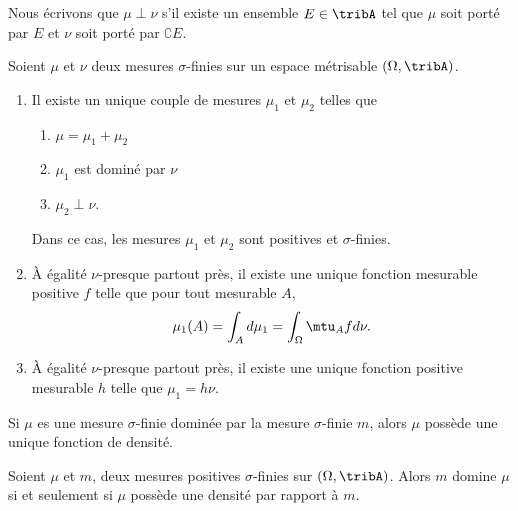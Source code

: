 Nous écrivons que \( \mu\perp\nu\) s'il existe un ensemble \( E\in\tribA\) tel que \( \mu\) soit porté par \( E\) et \( \nu\) soit porté par \( \complement E\).

\begin{theorem}
    Soient \( \mu\) et \( \nu\) deux mesures \( \sigma\)-finies sur un espace métrisable \( (\Omega,\tribA)\).
    \begin{enumerate}
        \item
            Il existe un unique couple de mesures \( \mu_1\) et \( \mu_2\) telles que
            \begin{enumerate}
                \item
                    \( \mu=\mu_1+\mu_2\)
                \item
                    \( \mu_1\) est dominé par \( \nu\)
                \item
                    \( \mu_2\perp \nu\).
            \end{enumerate}
            Dans ce cas, les mesures \( \mu_1\) et \( \mu_2\) sont positives et \( \sigma\)-finies.
        \item
            À égalité \(  \nu\)-presque partout près, il existe une unique fonction mesurable positive \( f\) telle que pour tout mesurable \( A\),
            \begin{equation}
                \mu_1(A)=\int_Ad\mu_1=\int_{\Omega}\mtu_Afd \nu.
            \end{equation}
        \item
            À égalité \( \nu\)-presque partout près, il existe une unique fonction positive mesurable \( h\) telle que \( \mu_1=h\nu\).
    \end{enumerate}
\end{theorem}

\begin{corollary}   \label{CorZDkhwS}
    Si \( \mu\) es une mesure \( \sigma\)-finie dominée par la mesure \( \sigma\)-finie \( m\), alors \( \mu\) possède une unique fonction de densité.
\end{corollary}

\begin{corollary}       \label{CorDomDens}
    Soient \( \mu\) et \( m\), deux mesures positives \( \sigma\)-finies sur \( (\Omega,\tribA)\). Alors \( m\) domine \( \mu\) si et seulement si \( \mu\) possède une densité par rapport à \( m\).
\end{corollary}
 
